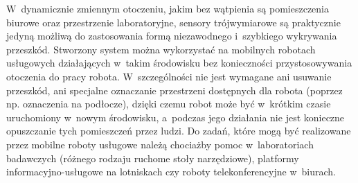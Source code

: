 W~dynamicznie zmiennym otoczeniu, jakim bez wątpienia są pomieszczenia biurowe oraz
przestrzenie laboratoryjne, sensory trójwymiarowe są praktycznie jedyną możliwą do
zastosowania formą niezawodnego i~szybkiego wykrywania przeszkód. Stworzony system
można wykorzystać na mobilnych robotach usługowych działających w~takim środowisku
bez konieczności przystosowywania otoczenia do pracy robota. W~szczególności nie jest
wymagane ani usuwanie przeszkód, ani specjalne oznaczanie przestrzeni dostępnych dla
robota (poprzez np. oznaczenia na podłocze), dzięki czemu robot może być w~krótkim
czasie uruchomiony w~nowym środowisku, a~podczas jego działania nie jest konieczne
opuszczanie tych pomieszczeń przez ludzi. Do zadań, które mogą być realizowane przez
mobilne roboty usługowe należą chociażby pomoc w~laboratoriach badawczych (różnego
rodzaju ruchome stoły narzędziowe), platformy informacyjno-usługowe na lotniskach
czy roboty telekonferencyjne w~biurach.
